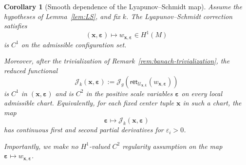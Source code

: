 \documentclass[11pt,reqno,a4paper]{amsart}
\numberwithin{equation}{section}
\theoremstyle{plain}
\newtheorem{corollary}[theorem]{Corollary}
\theoremstyle{remark}
\theoremstyle{plain}
\begin{document}
\begin{corollary}[Smooth dependence of the Lyapunov--Schmidt map]
\label{cor:LS-smooth}
Assume the hypotheses of Lemma~\ref{lem:LS}, and fix $k$.  The Lyapunov--Schmidt correction satisfies
\[
(\mathbf x,\boldsymbol\varepsilon)\longmapsto
w_{\mathbf x,\boldsymbol\varepsilon}\in H^1(M)
\]
is $C^1$ on the admissible configuration set.

Moreover, after the trivialization of Remark~\ref{rem:banach-trivialization}, the reduced functional
\[
\mathcal J_k(\mathbf x,\boldsymbol\varepsilon)
:=\mathcal J_g\left(
\mathsf{ret}_{\mathcal U_{\mathbf x,\boldsymbol\varepsilon}}
(w_{\mathbf x,\boldsymbol\varepsilon})
\right)
\]
is $C^1$ in $(\mathbf x,\boldsymbol\varepsilon)$ and is $C^2$ in the positive scale variables
$\boldsymbol\varepsilon$ on every local admissible chart.  Equivalently, for each fixed center tuple
$\mathbf x$ in such a chart, the map
\[
\boldsymbol\varepsilon\longmapsto \mathcal J_k(\mathbf x,\boldsymbol\varepsilon)
\]
has continuous first and second partial derivatives for $\varepsilon_i>0$.

Importantly, we make no $H^1$-valued $C^2$ regularity assumption on the map $\boldsymbol\varepsilon \mapsto w_{\mathbf x,\boldsymbol\varepsilon}$.
\end{corollary}
\end{document}
